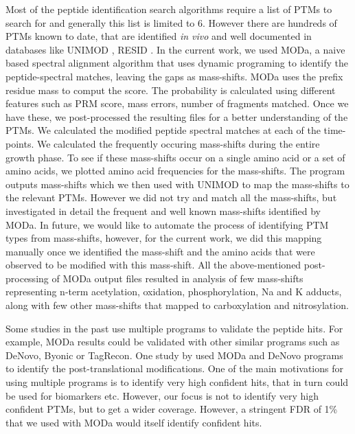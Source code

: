 \documentclass[12pt]{article}
\begin{document}
Most of the peptide identification search algorithms require a list of PTMs to search for and generally this list is limited to 6. However there are hundreds of PTMs known to date, that are identified \emph{in vivo} and well documented in databases like UNIMOD \cite{CreasyCottrell2004}, RESID \cite{Garavellietal2001}. In the current work, we used MODa, a naive based spectral alignment algorithm that uses dynamic programing to identify the peptide-spectral matches, leaving the gaps as mass-shifts. MODa uses the prefix residue mass to comput the score. The probability is calculated using different features such as PRM score, mass errors, number of fragments matched. Once we have these, we post-processed the resulting files for a better understanding of the PTMs. We calculated the modified peptide spectral matches at each of the time-points. We calculated the frequently occuring mass-shifts during the entire growth phase. To see if these mass-shifts occur on a single amino acid or a set of amino acids, we plotted amino acid frequencies for the mass-shifts. The program outputs mass-shifts which we then used with UNIMOD to map the mass-shifts to the relevant PTMs. However we did not try and match all the mass-shifts, but investigated in detail the frequent and well known mass-shifts identified by MODa. In future, we would like to automate the process of identifying PTM types from mass-shifts, however, for the current work, we did this mapping manually once we identified the mass-shift and the amino acids that were observed to be modified with this  mass-shift. All the above-mentioned post-processing of MODa output files resulted in analysis of few mass-shifts representing n-term acetylation, oxidation, phosphorylation, Na and K adducts, along with few other mass-shifts that mapped to carboxylation and nitrosylation. 

Some studies in the past use multiple programs to validate the peptide hits. For example, MODa results could be validated with other similar programs such as DeNovo, Byonic or TagRecon. One study by \cite{Liuetal2013} used MODa and DeNovo programs to identify the post-translational modifications. One of the main motivations for using multiple programs is to identify very high confident hits, that in turn could be used for biomarkers etc. However, our focus is not to identify very high confident PTMs, but to get a wider coverage. However, a stringent FDR of 1\% that we used with MODa would itself identify confident hits.
\end{document}
